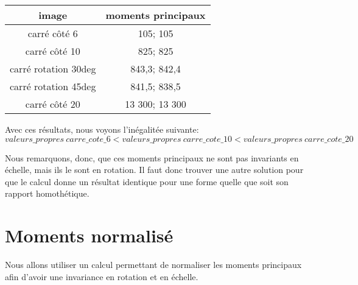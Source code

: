 \documentclass{article}
\begin{document}
  \begin{center}
    \begin{tabular}{|c|c|}
      \hline
      \textbf{image} & \textbf{moments principaux} \\
      \hline
      carré côté 6 & 105; 105 \\
      \hline
      carré côté 10 & 825; 825 \\
      \hline
      carré rotation 30deg & 843,3; 842,4 \\
      \hline
      carré rotation 45deg & 841,5; 838,5 \\
      \hline
      carré côté 20 & 13 300; 13 300 \\
      \hline
    \end{tabular}
  \end{center}
  
  Avec ces résultats, nous voyons l'inégalitée suivante:
  $$
    valeurs\_propres\ carre\_cote\_6 < valeurs\_propres\ carre\_cote\_10 < valeurs\_propres\ carre\_cote\_20
  $$
  
  Nous remarquons, donc, que ces moments principaux ne sont pas invariants en échelle, mais 
  ils le sont en rotation.
  Il faut donc trouver une autre solution pour que le calcul donne un résultat identique
  pour une forme quelle que soit son rapport homothétique.
  
  \newpage
  
  \section{Moments normalisé}
  Nous allons utiliser un calcul permettant de normaliser les moments principaux afin d'avoir
  une invariance en rotation et en échelle.\\
  
\end{document}
